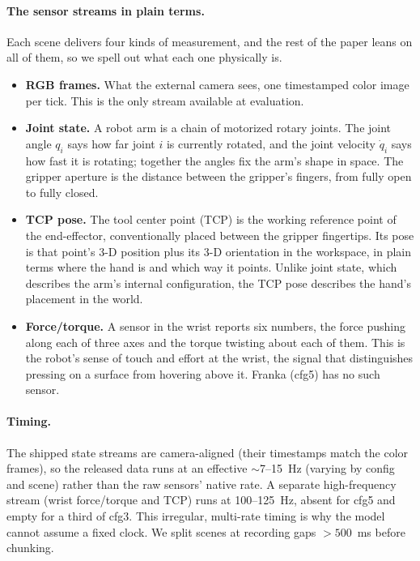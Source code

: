 \documentclass{article}
\begin{document}
\paragraph{The sensor streams in plain terms.}
Each scene delivers four kinds of measurement, and the rest of the paper leans on all of them, so we spell out what each one physically is.
\begin{itemize}
  \item \textbf{RGB frames.} What the external camera sees, one timestamped color image per tick. This is the only stream available at evaluation.
  \item \textbf{Joint state.} A robot arm is a chain of motorized rotary joints. The joint angle $q_i$ says how far joint $i$ is currently rotated, and the joint velocity $\dot q_i$ says how fast it is rotating; together the angles fix the arm's shape in space. The gripper aperture is the distance between the gripper's fingers, from fully open to fully closed.
  \item \textbf{TCP pose.} The tool center point (TCP) is the working reference point of the end-effector, conventionally placed between the gripper fingertips. Its pose is that point's 3-D position plus its 3-D orientation in the workspace, in plain terms where the hand is and which way it points. Unlike joint state, which describes the arm's internal configuration, the TCP pose describes the hand's placement in the world.
  \item \textbf{Force/torque.} A sensor in the wrist reports six numbers, the force pushing along each of three axes and the torque twisting about each of them. This is the robot's sense of touch and effort at the wrist, the signal that distinguishes pressing on a surface from hovering above it. Franka (cfg5) has no such sensor.
\end{itemize}

\paragraph{Timing.}
The shipped state streams are camera-aligned (their timestamps match the color frames), so the released data runs at an effective $\sim$7--15~Hz (varying by config and scene) rather than the raw sensors' native rate. A separate high-frequency stream (wrist force/torque and TCP) runs at 100--125~Hz, absent for cfg5 and empty for a third of cfg3. This irregular, multi-rate timing is why the model cannot assume a fixed clock. We split scenes at recording gaps $>500$~ms before chunking.
\end{document}
